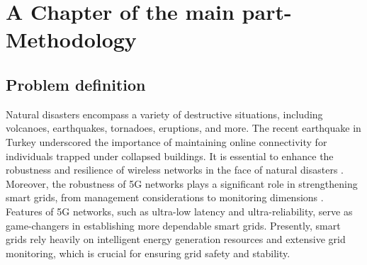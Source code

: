 

\chapter{A Chapter of the main part- Methodology }


 \section{Problem definition }
Natural disasters encompass a variety of destructive situations, including volcanoes, earthquakes, tornadoes, eruptions, and more. The recent earthquake in Turkey underscored the importance of maintaining online connectivity for individuals trapped under collapsed buildings. It is essential to enhance the robustness and resilience of wireless networks in the face of natural disasters \cite{Santos5GNetworks}. Moreover, the robustness of 5G networks plays a significant role in strengthening smart grids, from management considerations to monitoring dimensions \cite{Wong2017EnhancingRings}. Features of 5G networks, such as ultra-low latency and ultra-reliability, serve as game-changers in establishing more dependable smart grids. Presently, smart grids rely heavily on intelligent energy generation resources and extensive grid monitoring, which is crucial for ensuring grid safety and stability.

